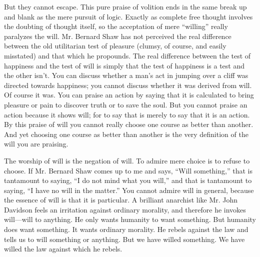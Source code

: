 But they cannot escape. This pure praise of volition ends in the same break up and blank as the mere pursuit of logic. Exactly as complete free thought involves the doubting of thought itself, so the acceptation of mere “willing” really paralyzes the will. Mr. Bernard Shaw has not perceived the real difference between the old utilitarian test of pleasure (clumsy, of course, and easily misstated) and that which he propounds. The real difference between the test of happiness and the test of will is simply that the test of happiness is a test and the other isn’t. You can discuss whether a man’s act in jumping over a cliff was directed towards happiness; you cannot discuss whether it was derived from will. Of course it was. You can praise an action by saying that it is calculated to bring pleasure or pain to discover truth or to save the soul. But you cannot praise an action because it shows will; for to say that is merely to say that it is an action. By this praise of will you cannot really choose one course as better than another. And yet choosing one course as better than another is the very definition of the will you are praising.

The worship of will is the negation of will. To admire mere choice is to refuse to choose. If Mr. Bernard Shaw comes up to me and says, “Will something,” that is tantamount to saying, “I do not mind what you will,” and that is tantamount to saying, “I have no will in the matter.” You cannot admire will in general, because the essence of will is that it is particular. A brilliant anarchist like Mr. John Davidson feels an irritation against ordinary morality, and therefore he invokes will—will to anything. He only wants humanity to want something. But humanity does want something. It wants ordinary morality. He rebels against the law and tells us to will something or anything. But we have willed something. We have willed the law against which he rebels.

